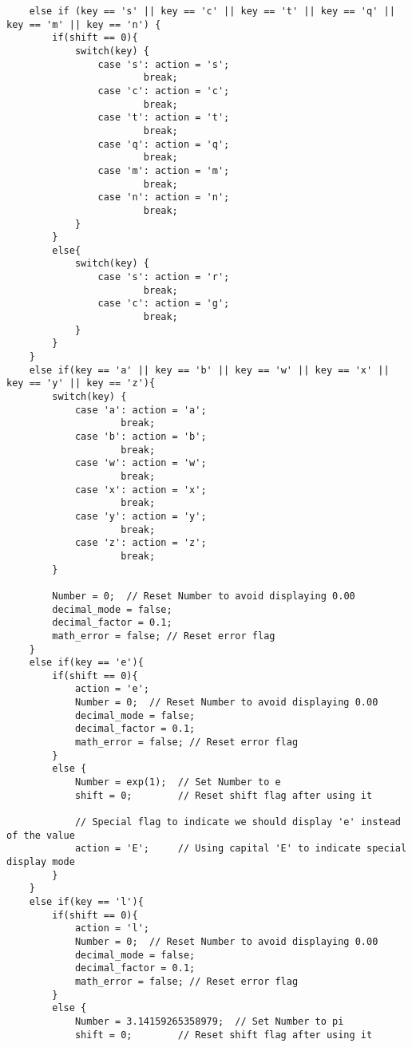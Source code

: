 \documentclass{article}
\begin{document}
\begin{verbatim}
    else if (key == 's' || key == 'c' || key == 't' || key == 'q' || key == 'm' || key == 'n') {
        if(shift == 0){
            switch(key) {
                case 's': action = 's';  
                        break;
                case 'c': action = 'c';  
                        break;
                case 't': action = 't';  
                        break;
                case 'q': action = 'q';  
                        break;
                case 'm': action = 'm';  
                        break;
                case 'n': action = 'n';  
                        break;
            }
        }
        else{
            switch(key) {
                case 's': action = 'r';  
                        break;
                case 'c': action = 'g';  
                        break;
            }
        }
    }
    else if(key == 'a' || key == 'b' || key == 'w' || key == 'x' || key == 'y' || key == 'z'){
        switch(key) {
            case 'a': action = 'a';  
                    break;
            case 'b': action = 'b';  
                    break;
            case 'w': action = 'w';  
                    break;
            case 'x': action = 'x';  
                    break;
            case 'y': action = 'y';  
                    break;
            case 'z': action = 'z';  
                    break;
        }
    
        Number = 0;  // Reset Number to avoid displaying 0.00
        decimal_mode = false;
        decimal_factor = 0.1;
        math_error = false; // Reset error flag
    }
    else if(key == 'e'){
        if(shift == 0){
            action = 'e';
            Number = 0;  // Reset Number to avoid displaying 0.00
            decimal_mode = false;
            decimal_factor = 0.1;
            math_error = false; // Reset error flag
        }
        else {
            Number = exp(1);  // Set Number to e
            shift = 0;        // Reset shift flag after using it
            
            // Special flag to indicate we should display 'e' instead of the value
            action = 'E';     // Using capital 'E' to indicate special display mode
        }
    }
    else if(key == 'l'){
        if(shift == 0){
            action = 'l';
            Number = 0;  // Reset Number to avoid displaying 0.00
            decimal_mode = false;
            decimal_factor = 0.1;
            math_error = false; // Reset error flag
        }
        else {
            Number = 3.14159265358979;  // Set Number to pi
            shift = 0;        // Reset shift flag after using it
            

\end{verbatim}
\end{document}
